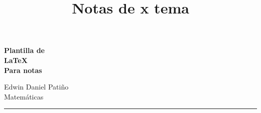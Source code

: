\documentclass{report}
\title{Notas de x tema}
\begin{document}
\begin{titlepage}
    \colorbox{primary}{
        \parbox[t]{0.93\textwidth}{
            \parbox[t]{0.91\textwidth}{
                \raggedleft
                \fontsize{50pt}{80pt}\selectfont
                \vspace{0.7cm}
                \textbf{
                    \color{white}
                    Plantilla de \\
                    LaTeX \\
                    Para notas \\
                }
                \vspace{0.7cm}
            }
        }
    }

    \vfill


    \parbox[t]{0.93\textwidth}{ %
    \raggedleft %
    \large %
    {\Large Edwin Daniel Patiño}\\[4pt] %
    Matemáticas\\[4pt]
    {\color{primary}
    \hfill\rule{0.2\linewidth}{1pt}%
    }
    }

\end{titlepage}

\tableofcontents




\end{document}
